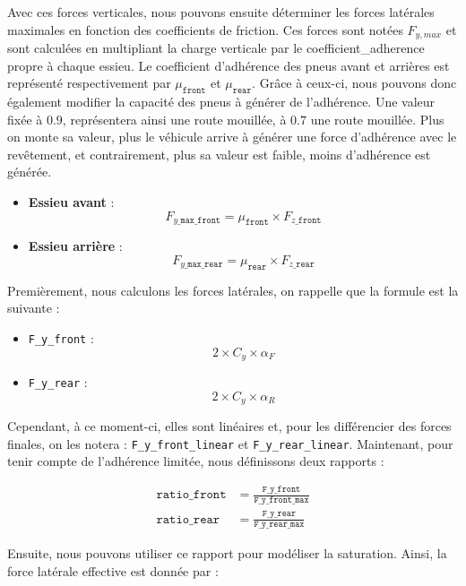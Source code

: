 Avec ces forces verticales, nous pouvons ensuite déterminer les forces latérales maximales en fonction des coefficients de friction.
Ces forces sont notées $F_{y, max}$ et sont calculées en multipliant la charge verticale par le \gls{coefficient_adherence} propre à chaque \gls{essieu}.
Le coefficient d'adhérence des pneus avant et arrières est représenté respectivement par $\mu_{\texttt{front}}$ et $\mu_{\texttt{rear}}$.
Grâce à ceux-ci, nous pouvons donc également modifier la capacité des pneus à générer de l'adhérence.
Une valeur fixée à $0.9$, représentera ainsi une route mouillée, à $0.7$ une route mouillée.
Plus on monte sa valeur, plus le véhicule arrive à générer une force d'adhérence avec le revêtement, et contrairement, plus sa valeur est faible, moins d'adhérence est générée.

\begin{itemize}
    \item \textbf{Essieu avant} :
    $$F_{y\_\texttt{max\_front}}= \mu_{\texttt{front}} \times F_{z\_\texttt{front}}$$
    \item \textbf{Essieu arrière} :
    $$F_{y\_\texttt{max\_rear}} = \mu_{\texttt{rear}} \times F_{z\_\texttt{rear}}$$
\end{itemize}

Premièrement, nous calculons les forces latérales, on rappelle que la formule est la suivante :

\begin{itemize}
    \item \texttt{F\_y\_front} : $$2 \times C_y \times \alpha_F$$
    \item \texttt{F\_y\_rear} : $$2 \times C_y \times \alpha_R$$
\end{itemize}

Cependant, à ce moment-ci, elles sont linéaires et, pour les différencier des forces finales, on les notera : \texttt{F\_y\_front\_linear} et \texttt{F\_y\_rear\_linear}.
Maintenant, pour tenir compte de l'adhérence limitée, nous définissons deux rapports :

\begin{align}
    \texttt{ratio\_front} &= \frac{\texttt{F\_y\_front}}{\texttt{F\_y\_front\_max}} \\
    \texttt{ratio\_rear} &= \frac{\texttt{F\_y\_rear}}{\texttt{F\_y\_rear\_max}}
\end{align}

Ensuite, nous pouvons utiliser ce rapport pour modéliser la saturation.
Ainsi, la force latérale effective est donnée par :

